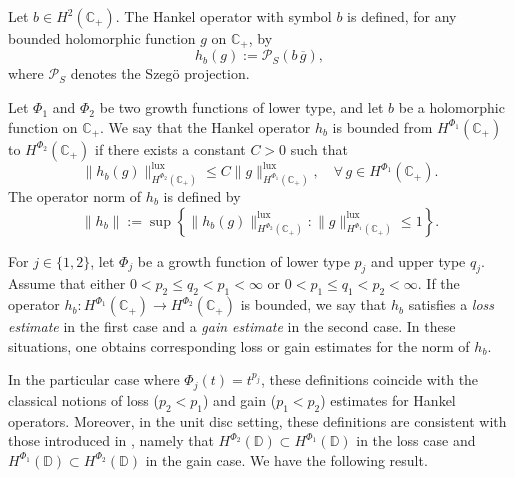 \documentclass[a4paper,12pt,intlimits,oneside]{amsart}
\theoremstyle{definition}
\numberwithin{equation}{section}
\theoremstyle{definition}
\begin{document}
Let $b \in H^{2}(\mathbb{C}_{+})$. The Hankel operator with symbol $b$ is defined, for any bounded holomorphic function $g$ on $\mathbb{C}_{+}$, by
\[
h_{b}(g) := \mathcal{P}_{S}(b\, \overline{g}),
\]
where $\mathcal{P}_{S}$ denotes the Szeg\"o projection.

Let $\Phi_{1}$ and $\Phi_{2}$ be two growth functions of lower type, and let $b$ be a holomorphic function on $\mathbb{C}_{+}$. We say that the Hankel operator $h_{b}$ is bounded from $H^{\Phi_{1}}(\mathbb{C}_{+})$ to $H^{\Phi_{2}}(\mathbb{C}_{+})$ if there exists a constant $C>0$ such that
\begin{equation}\label{eq:ineitedaaqpqqehay}
\|h_{b}(g)\|_{H^{\Phi_{2}}(\mathbb{C}_{+})}^{\mathrm{lux}} \leq C \|g\|_{H^{\Phi_{1}}(\mathbb{C}_{+})}^{\mathrm{lux}}, \quad \forall\, g \in H^{\Phi_{1}}(\mathbb{C}_{+}).
\end{equation}
The operator norm of $h_b$ is defined by
\[
\|h_{b}\|:= \sup \left\{ \|h_{b}(g)\|_{H^{\Phi_{2}}(\mathbb{C}_{+})}^{\mathrm{lux}} : \|g\|_{H^{\Phi_{1}}(\mathbb{C}_{+})}^{\mathrm{lux}} \leq 1 \right\}.
\]


For $j \in \{1,2\}$, let $\Phi_{j}$ be a growth function of lower type $p_{j}$ and upper type $q_{j}$. 
Assume that either $0 < p_{2} \leq q_{2} < p_{1} < \infty$ or $0 < p_{1} \leq q_{1} < p_{2} < \infty$. 
If the operator $h_{b}: H^{\Phi_{1}}(\mathbb{C}_{+}) \to H^{\Phi_{2}}(\mathbb{C}_{+})$ is bounded, we say that $h_{b}$ satisfies a \emph{loss estimate} in the first case and a \emph{gain estimate} in the second case. In these situations, one obtains corresponding loss or gain estimates for the norm of $h_b$.

In the particular case where $\Phi_{j}(t) = t^{p_{j}}$, these definitions coincide with the classical notions of loss ($p_{2} < p_{1}$) and gain ($p_{1} < p_{2}$) estimates for Hankel operators.
Moreover, in the unit disc setting, these definitions are consistent with those introduced in \cite{djefeuto1}, namely that $H^{\Phi_{2}}(\mathbb{D}) \subset H^{\Phi_{1}}(\mathbb{D})$ in the loss case and $H^{\Phi_{1}}(\mathbb{D}) \subset H^{\Phi_{2}}(\mathbb{D})$ in the gain case. We have the following result.
\end{document}
